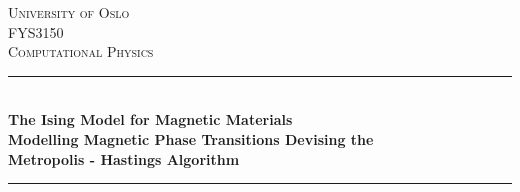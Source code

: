 	\begin{titlepage} %
		\newcommand{\HRule}{\rule{\linewidth}{0.5mm}} %
		
		\center %
		
		
		\textsc{\LARGE University of Oslo}\\[1.5cm] %
		
		\textsc{\Large FYS3150}\\[0.5cm] %
		
		\textsc{\large Computational Physics}\\[0.5cm] %
		
		
		\HRule\\[0.4cm]
		
		{\huge\bfseries The Ising Model for Magnetic Materials\\
		\Large{Modelling Magnetic Phase Transitions Devising the\\ Metropolis - Hastings Algorithm}\\[0.4cm] %
		}
		\HRule\\[1.5cm]
		
		
		

\end{titlepage}
